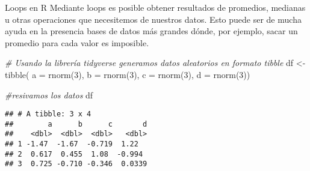 \documentclass[
  8pt,
  ignorenonframetext,
]{beamer}
\newenvironment{Shaded}{\begin{snugshade}}{\end{snugshade}}
\newcommand{\AttributeTok}[1]{\textcolor[rgb]{0.77,0.63,0.00}{#1}}
\newcommand{\CommentTok}[1]{\textcolor[rgb]{0.56,0.35,0.01}{\textit{#1}}}
\newcommand{\DecValTok}[1]{\textcolor[rgb]{0.00,0.00,0.81}{#1}}
\newcommand{\FunctionTok}[1]{\textcolor[rgb]{0.00,0.00,0.00}{#1}}
\newcommand{\NormalTok}[1]{#1}
\newcommand{\OtherTok}[1]{\textcolor[rgb]{0.56,0.35,0.01}{#1}}
\begin{document}
\begin{frame}[fragile]{Loops en R}
\protect\hypertarget{loops-en-r-3}{}
Mediante loops es posible obtener resultados de promedios, medianas u
otras operaciones que necesitemos de nuestros datos. Esto puede ser de
mucha ayuda en la presencia bases de datos más grandes dónde, por
ejemplo, sacar un promedio para cada valor es imposible.

\begin{Shaded}
\begin{Highlighting}[]
\CommentTok{\# Usando la librería tidyverse generamos datos aleatorios en formato tibble}
\NormalTok{df }\OtherTok{\textless{}{-}} \FunctionTok{tibble}\NormalTok{(}
  \AttributeTok{a =} \FunctionTok{rnorm}\NormalTok{(}\DecValTok{3}\NormalTok{),}
  \AttributeTok{b =} \FunctionTok{rnorm}\NormalTok{(}\DecValTok{3}\NormalTok{),}
  \AttributeTok{c =} \FunctionTok{rnorm}\NormalTok{(}\DecValTok{3}\NormalTok{),}
  \AttributeTok{d =} \FunctionTok{rnorm}\NormalTok{(}\DecValTok{3}\NormalTok{))}

\CommentTok{\#resivamos los datos}
\NormalTok{df}
\end{Highlighting}
\end{Shaded}

\begin{verbatim}
## # A tibble: 3 x 4
##        a      b      c       d
##    <dbl>  <dbl>  <dbl>   <dbl>
## 1 -1.47  -1.67  -0.719  1.22  
## 2  0.617  0.455  1.08  -0.994 
## 3  0.725 -0.710 -0.346  0.0339
\end{verbatim}
\end{frame}
\end{document}

